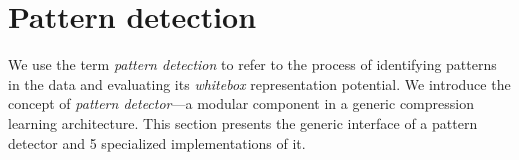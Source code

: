 \section{Pattern detection}
\label{sec:pd}





% 

We use the term \textit{pattern detection} to refer to the process of identifying patterns in the data and evaluating its \textit{whitebox} representation potential. We introduce the concept of \textit{pattern detector}---a modular component in a generic compression learning architecture. This section presents the generic interface of a pattern detector and 5 specialized implementations of it.













% 

